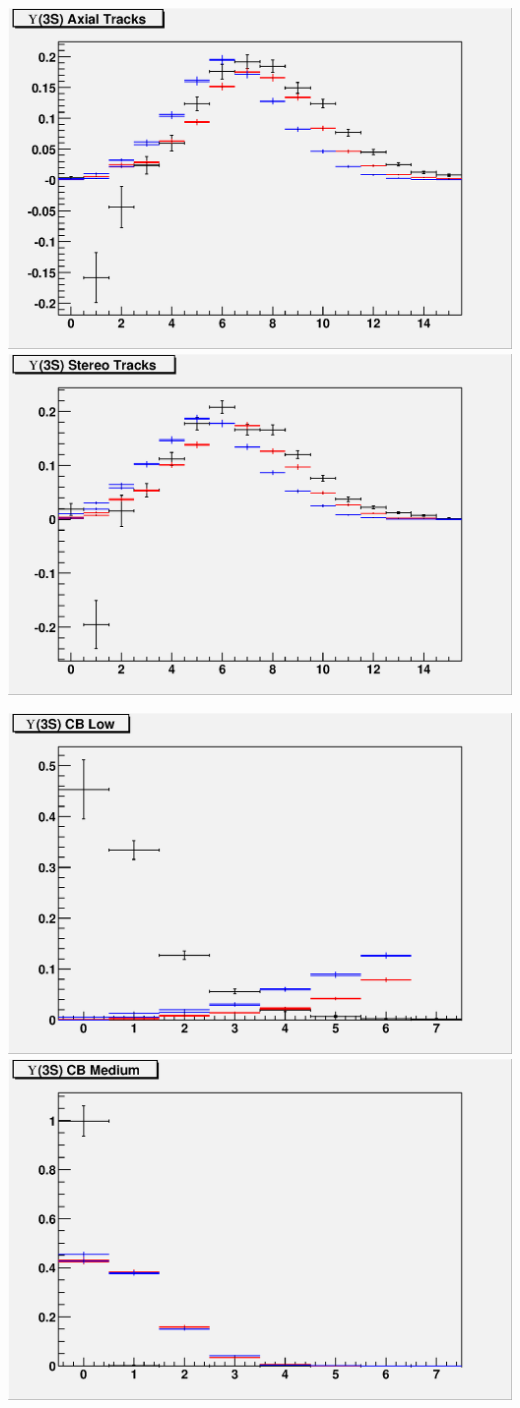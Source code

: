 \documentclass[12pt]{article}
\begin{document}
\includegraphics[width=\linewidth]{trigger3_trax.eps}
\vfill
\includegraphics[width=\linewidth]{trigger3_trst.eps}

\includegraphics[width=\linewidth]{trigger3_cblo.eps}
\vfill
\includegraphics[width=\linewidth]{trigger3_cbmd.eps}
\end{document}
